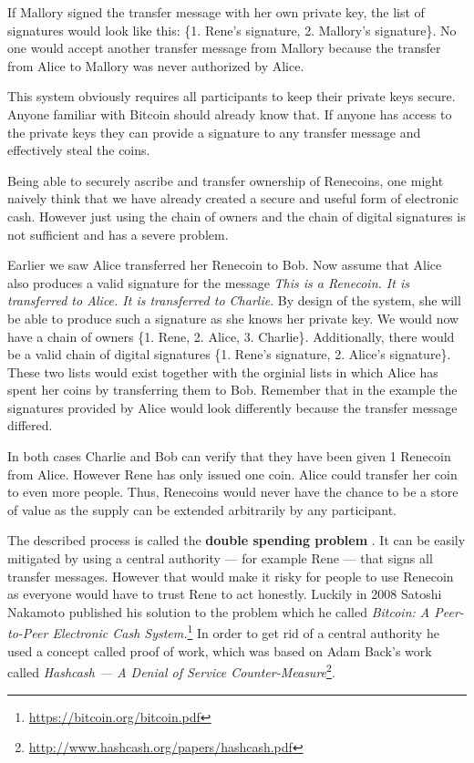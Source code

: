 \documentclass[a4paper,12pt,oneside,openany]{book}
\begin{document}
If Mallory signed the transfer message with her own private key, the list of signatures would look like this: \{1. Rene's signature, 2. Mallory's signature\}.
No one would accept another transfer message from Mallory because the transfer from Alice to Mallory was never authorized by Alice.

This system obviously requires all participants to keep their private keys secure.
Anyone familiar with Bitcoin should already know that.
If anyone has access to the private keys they can provide a signature to any transfer message and effectively steal the coins. 

Being able to securely ascribe and transfer ownership of Renecoins, one might naively think that we have already created a secure and useful form of electronic cash.
However just using the chain of owners and the chain of digital signatures is not sufficient and has a severe problem. 

Earlier we saw Alice transferred her Renecoin to Bob. Now assume that Alice also produces a valid signature for the message \textit{This is a Renecoin. It is transferred to Alice. It is transferred to Charlie}.
By design of the system, she will be able to produce such a signature as she knows her private key.
We would now have a chain of owners  \{1. Rene, 2. Alice, 3. Charlie\}.
Additionally, there would be a valid chain of digital signatures \{1. Rene's signature, 2. Alice's signature\}.
These two lists would exist together with the orginial lists in which Alice has spent her coins by transferring them to Bob.
Remember that in the example  the signatures provided by Alice would look differently because the transfer message differed.

In both cases Charlie and Bob can verify that they have been given 1 Renecoin from Alice.
However Rene has only issued one coin.
Alice could transfer her coin to even more people.
Thus, Renecoins would never have the chance to be a store of value as the supply can be extended arbitrarily by any participant.

The described process is called the \textbf{double spending problem} .
It can be easily mitigated by using a central authority --- for example Rene --- that signs all transfer messages.
However that would make it risky for people to use Renecoin as everyone would have to trust Rene to act honestly.
Luckily in 2008 Satoshi Nakamoto published his solution to the problem which he called \textit{Bitcoin: A Peer-to-Peer Electronic Cash System.}\footnote{\url{https://bitcoin.org/bitcoin.pdf}}
In order to get rid of a central authority he used a concept called proof of work, which was based on Adam Back's work called \textit{Hashcash --- A Denial of Service Counter-Measure}\footnote{\url{http://www.hashcash.org/papers/hashcash.pdf}}.
\end{document}
